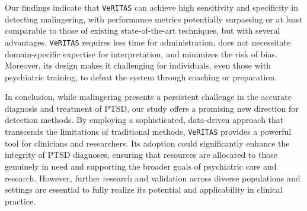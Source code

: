 \documentclass[onecolumn,10pt]{IEEEtran}
\def\vrts{\texttt{VeRITAS}\xspace}
\begin{document}
Our findings indicate that \vrts can achieve high sensitivity and specificity in detecting malingering, with performance metrics potentially surpassing or at least comparable to those of existing state-of-the-art techniques, but with several advantages. \vrts requires less time for administration, does not necessitate domain-specific expertise for interpretation, and minimizes the risk of bias. Moreover, its design makes it challenging for individuals, even those with psychiatric training, to defeat the system through coaching or preparation.

In conclusion, while malingering presents a persistent challenge in the accurate diagnosis and treatment of PTSD, our study offers a promising new direction for detection methods. By employing a sophisticated, data-driven approach that transcends the limitations of traditional methods, \vrts provides a powerful tool for clinicians and researchers. Its adoption could significantly enhance the integrity of PTSD diagnoses, ensuring that resources are allocated to those genuinely in need and supporting the broader goals of psychiatric care and research. However, further research and validation across diverse populations and settings are essential to fully realize its potential and applicability in clinical practice.






\end{document}
